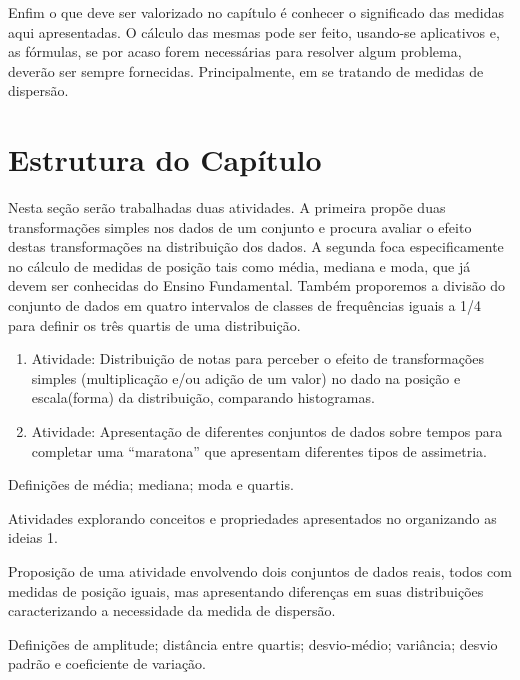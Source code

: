 \begin{apresentacao}
Enfim o que deve ser valorizado no capítulo é conhecer o significado das medidas aqui apresentadas. O cálculo das mesmas pode ser feito, usando-se aplicativos e, as fórmulas, se por acaso forem necessárias para resolver algum problema, deverão ser sempre fornecidas. Principalmente, em se tratando de medidas de dispersão.

\section{Estrutura do Capítulo}


Nesta seção serão trabalhadas duas atividades. A primeira propõe duas transformações simples nos dados de um conjunto e procura avaliar o efeito destas transformações na distribuição dos dados. A segunda foca especificamente no cálculo de medidas de posição tais como média, mediana e moda, que já devem ser conhecidas do Ensino Fundamental. Também proporemos a divisão do conjunto de dados em quatro intervalos de classes de frequências iguais a 1/4 para definir os três quartis de uma distribuição.

\begin{enumerate}
\item Atividade: Distribuição de notas para perceber o efeito de transformações simples (multiplicação e/ou adição de um valor) no dado na posição e escala(forma) da distribuição, comparando histogramas.
\item Atividade: Apresentação de diferentes conjuntos de dados sobre tempos para completar uma “maratona”{} que apresentam diferentes tipos de assimetria.
\end{enumerate}


Definições de média; mediana; moda e quartis.

Atividades explorando conceitos e propriedades apresentados no organizando as ideias 1.

Proposição de uma atividade envolvendo dois conjuntos de dados reais, todos com medidas de posição iguais, mas apresentando diferenças em suas distribuições caracterizando a necessidade da medida de dispersão.

Definições de amplitude; distância entre quartis; desvio-médio; variância; desvio padrão e coeficiente de variação.


\end{apresentacao}
